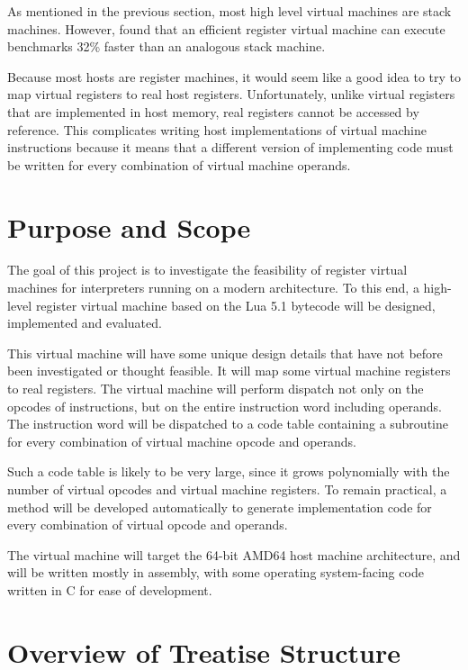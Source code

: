 		As mentioned in the previous section, most high level virtual machines are stack machines. However, \cite{stackregistershowdown} found that an efficient register virtual machine can execute benchmarks 32\% faster than an analogous stack machine. 
		
		Because most hosts are register machines, it would seem like a good idea to try to map virtual registers to real host registers. Unfortunately, unlike virtual registers that are implemented in host memory, real registers cannot be accessed by reference.  This complicates writing host implementations of virtual machine instructions because it means that a different version of implementing code must be written for every combination of virtual machine operands.
	
	\section{Purpose and Scope}
		The goal of this project is to investigate the feasibility of register virtual machines for interpreters running on a modern architecture. To this end, a high-level register virtual machine based on the Lua 5.1 bytecode will be designed, implemented and evaluated.
	
		This virtual machine will have some unique design details that have not before been investigated or thought feasible. It will map some virtual machine registers to real registers. The virtual machine will perform dispatch not only on the opcodes of instructions, but on the entire instruction word including operands. The instruction word will be dispatched to a code table containing a subroutine for every combination of virtual machine opcode and operands. 
		
		Such a code table is likely to be very large, since it grows polynomially with the number of virtual opcodes and virtual machine registers. To remain practical, a method will be developed automatically to generate implementation code for every combination of virtual opcode and operands. 
	
		The virtual machine will target the 64-bit AMD64 host machine architecture, and will be written mostly in assembly, with some operating system-facing code written in C for ease of development.  
	
	\section{Overview of Treatise Structure}
	
